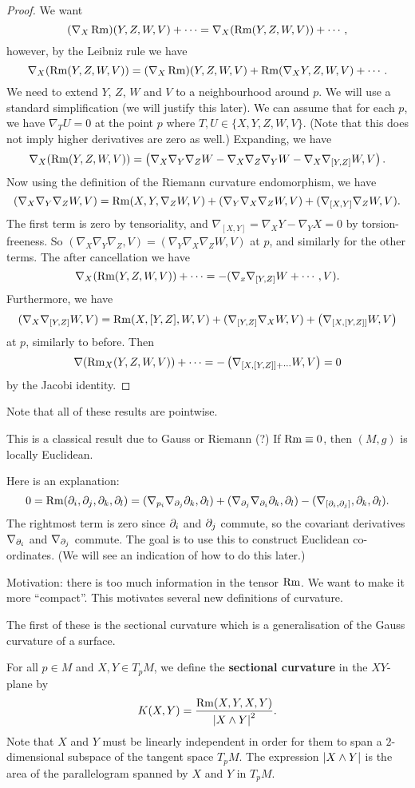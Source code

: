 \begin{proof}
  We want
  \[ (\nabla_X\operatorname{Rm})(Y,Z,W,V) + \cdots = \nabla_X(\operatorname{Rm}(Y,Z,W,V)) + \cdots, \]
  however, by the Leibniz rule we have
  \[ \nabla_X(\operatorname{Rm}(Y,Z,W,V)) = (\nabla_X\operatorname{Rm})(Y,Z,W,V) + \operatorname{Rm}(\nabla_XY,Z,W,V) + \cdots. \]
  We need to extend $Y$, $Z$, $W$ and $V$ to a neighbourhood around $p$.
  We will use a standard simplification (we will justify this later).
  We can assume that for each $p$, we have $\nabla_TU=0$ at the point $p$ where $T,U\in\{X,Y,Z,W,V\}$.
  (Note that this does not imply higher derivatives are zero as well.)
  Expanding, we have
  \[ \nabla_X(\operatorname{Rm}(Y,Z,W,V)) = \left( \nabla_X\nabla_Y\nabla_ZW - \nabla_X\nabla_Z\nabla_YW - \nabla_X\nabla_{[Y,Z]}W, V \right). \]
  Now using the definition of the Riemann curvature endomorphism, we have
  \[ (\nabla_X\nabla_Y\nabla_ZW,V) = \operatorname{Rm}(X,Y,\nabla_ZW,V) + (\nabla_Y\nabla_X\nabla_ZW,V) + (\nabla_{[X,Y]}\nabla_ZW,V). \]
  The first term is zero by tensoriality, and $\nabla_{[X,Y]}=\nabla_XY-\nabla_YX=0$ by torsion-freeness.
  So $(\nabla_X\nabla_Y\nabla_Z,V)=(\nabla_Y\nabla_X\nabla_ZW,V)$ at $p$, and similarly for the other terms.
  The after cancellation we have
  \[ \nabla_X(\operatorname{Rm}(Y,Z,W,V)) + \cdots = -(\nabla_x\nabla_{[Y,Z]}W + \cdots, V). \]
  Furthermore, we have
  \[ (\nabla_X\nabla_{[Y,Z]}W,V) = \operatorname{Rm}(X,[Y,Z],W,V) + (\nabla_{[Y,Z]}\nabla_XW,V) + \left(\nabla_{\left[ X,[Y,Z] \right]}W,V \right) \]
  at $p$, similarly to before.
  Then
  \[ \nabla(\operatorname{Rm}_X(Y,Z,W,V)) + \cdots = -\left( \nabla_{\left[ X,[Y,Z] \right] + \cdots} W,V \right) = 0 \]
  by the Jacobi identity.
\end{proof}

Note that all of these results are pointwise.

\begin{rmk}
  This is a classical result due to Gauss or Riemann (?)
  If $\operatorname{Rm}\equiv0$, then $(M,g)$ is locally Euclidean.

  Here is an explanation:
  \[ 0 = \operatorname{Rm}(\partial_i,\partial_j,\partial_k,\partial_l) = (\nabla_{p_i}\nabla_{\partial_j}\partial_k,\partial_l) + (\nabla_{\partial_j}\nabla_{\partial_i}\partial_k,\partial_l) - (\nabla_{[\partial_i,\partial_j]},\partial_k,\partial_l). \]
  The rightmost term is zero since $\partial_i$ and $\partial_j$ commute, so the covariant derivatives $\nabla_{\partial_i}$ and $\nabla_{\partial_j}$ commute.
  The goal is to use this to construct Euclidean co-ordinates.
  (We will see an indication of how to do this later.)
\end{rmk}

Motivation: there is too much information in the tensor $\operatorname{Rm}$.
We want to make it more ``compact''.
This motivates several new definitions of curvature.

The first of these is the sectional curvature which is a generalisation of the Gauss curvature of a surface.

\begin{defn}
  For all $p\in M$ and $X,Y\in T_pM$, we define the \textbf{sectional curvature} in the $XY$-plane by
  \[ K(X,Y) = \frac{\operatorname{Rm}(X,Y,X,Y)}{\left\lvert X \wedge Y \right\rvert^2}. \]
  Note that $X$ and $Y$ must be linearly independent in order for them to span a $2$-dimensional subspace of the tangent space $T_pM$.
  The expression $\left\lvert X \wedge Y \right\rvert$ is the area of the parallelogram spanned by $X$ and $Y$ in $T_pM$.
\end{defn}
